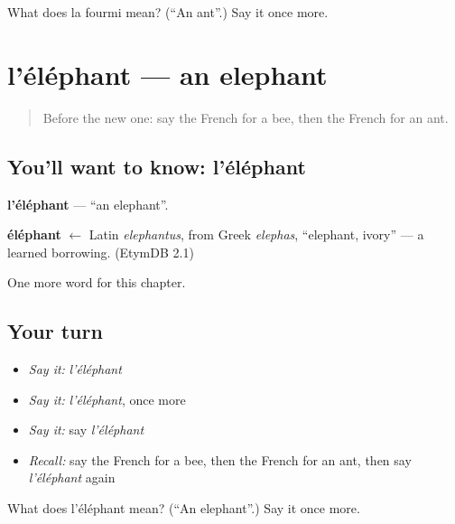 \begin{tcolorbox}[breakable,colback=teal!4,colframe=teal!35!black,title={Before you move on}]
What does la fourmi mean? (\textquotedblleft{}An ant\textquotedblright{}.) Say it once more.
\end{tcolorbox}
\section[l'éléphant]{l'éléphant — an elephant}

\label{lesson:FR-C88-elephant}



\begin{quote}
Before the new one: say the French for a bee, then the French for an ant.
\end{quote}

\subsection*{You'll want to know: l'éléphant}
\textbf{l'éléphant} — \textquotedblleft{}an elephant\textquotedblright{}.

\begin{cousinweb}
\textbf{éléphant} $\leftarrow$ Latin \emph{elephantus}, from Greek \emph{elephas}, \textquotedblleft{}elephant, ivory\textquotedblright{} — a learned borrowing. (EtymDB 2.1)
\end{cousinweb}

\begin{grammarlens}[title={What you've built}]
One more word for this chapter.
\end{grammarlens}

\subsection*{Your turn}
\begin{itemize}
\raggedright
  \item \emph{Say it:} \emph{l'éléphant}
  \item \emph{Say it:} \emph{l'éléphant}, once more
  \item \emph{Say it:} say \emph{l'éléphant}
  \item \emph{Recall:} say the French for a bee, then the French for an ant, then say \emph{l'éléphant} again
\end{itemize}

\begin{tcolorbox}[breakable,colback=teal!4,colframe=teal!35!black,title={Before you move on}]
What does l'éléphant mean? (\textquotedblleft{}An elephant\textquotedblright{}.) Say it once more.
\end{tcolorbox}
